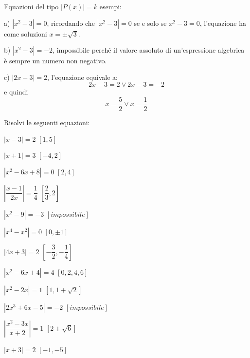 \begin{esercizio}\label{ese:03.1}
Equazioni del tipo $|P(x)|=k$ esempi:
\begin{enumeratea}
\item[a)] $|x^2-3|=0$, ricordando che $|x^2-3|=0$ se e solo se $x^2-3=0$, 
l'equazione ha come soluzioni $x=\pm\sqrt{3}$.
\item[b)] $|x^2-3|=-2$, impossibile perché il valore assoluto di 
un'espressione 
algebrica è sempre un numero non negativo.
\item[c)] $|2x-3|=2$, l'equazione equivale a:
$$2x-3=2 \vee 2x-3=-2$$
e quindi
$$x=\dfrac{5}{2}\vee x=\dfrac{1}{2}$$
\end{enumeratea}

\noindent Risolvi le seguenti equazioni:

\begin{multicols}{2}
\begin{enumeratea}
\item $|x-3|=2$ \hfill $\left[ 1, 5\right] $
\item $|x+1|=3$ \hfill $\left[ -4, 2\right] $
\item $|x^2-6x+8|=0$ \hfill $\left[ 2, 4\right] $
\item $\left| \dfrac{x-1}{2x}\right| =\dfrac{1}{4}$ \hfill $\left[ 
\dfrac{2}{3}, 2\right] $
\item $|x^2-9|=-3$ \hfill $\left[impossibile \right] $
\item $|x^4-x^2|=0$ \hfill $\left[ 0, \pm 1\right] $
\item $|4x+3|=2$ \hfill $\left[ -\dfrac{3}{2}, -\dfrac{1}{4} \right] $
\item $|x^2-6x+4|=4$ \hfill $\left[ 0, 2, 4 , 6 \right] $
\item $|x^2-2x|=1$ \hfill $\left[ 1, 1+\sqrt{2} \right] $
\item $|2x^3+6x-5|=-2$ \hfill $\left[ impossibile \right] $
\item $\left| \dfrac{x^2-3x}{x+2}\right| =1$ \hfill $\left[ 2\pm 
\sqrt{6} \right] $
\item $|x+3|=2$ \hfill $\left[ -1, -5 \right] $
\end{enumeratea}
\end{multicols}
\end{esercizio}

